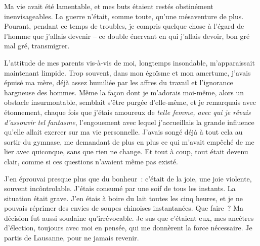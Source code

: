 \documentclass[
  extrafontsizes,
  oneside,
  14pt
]{memoir}
\begin{document}
Ma vie avait été lamentable, et mes buts étaient restés obstinément
inenvisageables. La guerre n'était, somme toute, qu'une mésaventure de
plus. Pourant, pendant ce temps de troubles, je compris quelque chose à
l'égard de l'homme que j'allais devenir -- ce double énervant en qui
j'allais devoir, bon gré mal gré, transmigrer.

L'attitude de mes parents vis-à-vis de moi, longtemps insondable,
m'apparaissait maintenant limpide. Trop souvent, dans mon égoïsme et mon
amertume, j'avais épuisé ma mère, déjà assez humiliée par les affres du
travail et l'ignorance hargneuse des hommes. Même la façon dont je
m'adorais moi-même, alors un obstacle insurmontable, semblait s'être
purgée d'elle-même, et je remarquais avec étonnement, chaque fois que
j'étais amoureux de \emph{telle femme, avec qui je rêvais d'assouvir tel
fantasme}, l'engouement avec lequel j'accueillais la grande influence
qu'elle allait exercer sur ma vie personnelle. J'avais songé déjà à tout
cela au sortir du gymnase, me demandant de plus en plus ce qui m'avait
empêché de me lier avec quiconque, sans que rien ne change. Et tout à
coup, tout était devenu clair, comme si ces questions n'avaient même pas
existé.

J'en éprouvai presque plus que du bonheur~: c'était de la joie, une joie
violente, souvent incôntrolable. J'étais consumé par une soif de tous
les instants. La situation était grave. J'en étais à boire du lait
toutes les cinq heures, et je ne pouvais réprimer des envies de soupes
chinoises instantanées. Que faire~? Ma décision fut aussi soudaine
qu'irrévocable. Je sus que c'étaient eux, mes ancêtres d'élection,
toujours avec moi en pensée, qui me donnèrent la force nécessaire. Je
partis de Lausanne, pour ne jamais revenir.
\end{document}
